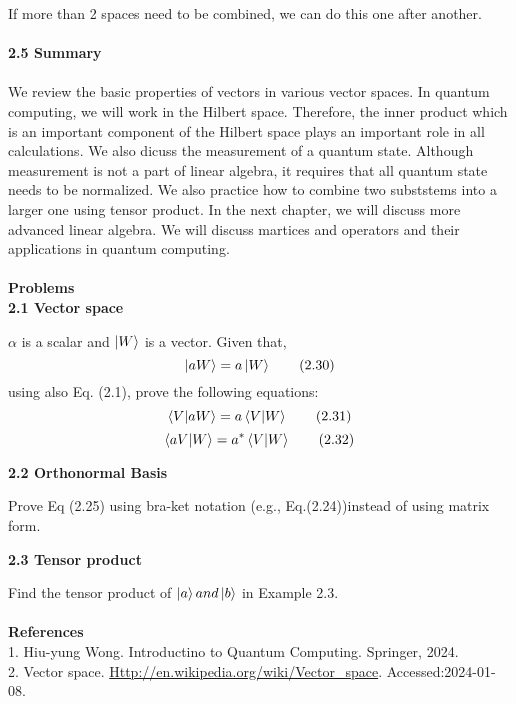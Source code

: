 \documentclass{article}
\begin{document}
If more than 2 spaces need to be combined, we can do this one after another.
\\
\\
\textbf{\large 2.5 Summary}
\\
\\
We review the basic properties of vectors in various vector spaces. In quantum computing, we will work in the Hilbert space. Therefore, the inner product
which is an important component of the Hilbert space plays an important role in all
calculations. We also dicuss the measurement of a quantum state. Although measurement is not a part of linear algebra, it requires that
all quantum state needs to be normalized. We also practice how to combine two subststems into a larger
one using tensor product. In the next chapter, we will discuss more advanced linear algebra.
We will discuss martices and operators and their applications in quantum computing.
\\
\\
\textbf{\large Problems}\\


\textbf{2.1 Vector space}

$\alpha$ is a scalar and $\ket{W}$ is a vector. Given that,
\begin{equation}
    \ket{aW} = a\ket{W} \tag{2.30}
\end{equation}
using also Eq. (2.1), prove the following equations:
\begin{equation}
    \braket{V|aW} = a \braket{V|W} \tag{2.31}\\
\end{equation}
\begin{equation}
    \braket{aV|W} = a^* \braket{V|W} \tag{2.32}\\
    \end{equation}

\textbf{    2.2 Orthonormal Basis}

    Prove Eq (2.25) using bra-ket notation (e.g., Eq.(2.24))instead of using matrix form.

\textbf{    2.3 Tensor product}

    Find the tensor product of $\ket{a} and \ket{b}$ in Example 2.3.
\\
\\
\textbf{\large References}\\
    1. Hiu-yung Wong. Introductino to Quantum Computing. Springer, 2024.\\
    2. Vector space. \url{Http://en.wikipedia.org/wiki/Vector_space}. Accessed:2024-01-08.
    
\end{document}

